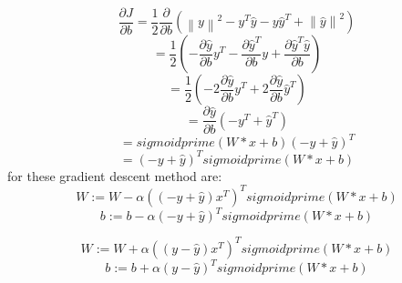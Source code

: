 \documentclass[12pt,letterpaper]{article}
\newcommand{\norm}[1]{\left\lVert#1\right\rVert}
\newcommand{\<}{\langle}
\renewcommand{\>}{\rangle}
\theoremstyle{definition}
\begin{document}
$$\frac{\partial J}{\partial b}=\frac{1}{2}\frac{\partial  }{\partial b}{(\norm{y}^2-y^T\hat y-y\hat y^T+\norm{\hat y}^2)}$$
$$=\frac{1}{2}(-\frac{\partial \hat y}{\partial b}y^T-\frac{\partial \hat y^T}{\partial b}y+\frac{\partial \hat y^T\hat y }{\partial b})$$
$$=\frac{1}{2}(-2\frac{\partial \hat y}{\partial b}y^T+2\frac{\partial \hat y }{\partial b}\hat y^T)$$
$$=\frac{\partial \hat y}{\partial b}(-y^T+\hat y^T)$$
$$=sigmoidprime(W*x + b)(-y+\hat y)^T$$
$$=(-y+\hat y)^Tsigmoidprime(W*x + b)$$
 for these gradient descent method are:
$$W:=W-\alpha ((-y+\hat y)x^T)^Tsigmoidprime(W*x + b)$$
$$b:=b-\alpha (-y+\hat y)^Tsigmoidprime(W*x + b)$$

$$W:=W+\alpha ((y-\hat y)x^T)^Tsigmoidprime(W*x + b)$$
$$b:=b+\alpha (y-\hat y)^Tsigmoidprime(W*x + b)$$
\end{document}
